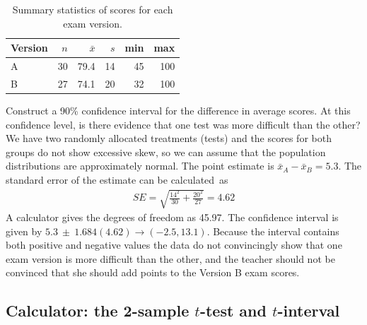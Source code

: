 \begin{table}[hht]
\centering
\begin{tabular}{l rrrrr}
\hline
Version\hspace{2mm}	& $n$	& $\bar{x}$	& $s$	& min	& max  \\
\hline
A		& 30		& 79.4		& 14 	& 45		& 100 \\
B		& 27		& 74.1		& 20		& 32		& 100 \\
\hline
\end{tabular}
\caption{Summary statistics of scores for each exam version.}
\label{summaryStatsForTwoVersionsOfExams2nd}
\end{table}

\begin{example}{Construct a 90\% confidence interval for the difference in average scores. At this confidence level, is there evidence that one test was more difficult than the other?}
We have two randomly allocated treatments (tests) and the scores for both groups do not show excessive skew, so we can assume that the population distributions are approximately normal. The point estimate is $\bar{x}_A - \bar{x}_B = 5.3$. The standard error of the estimate can be calculated~as
\begin{eqnarray*}
SE = \sqrt{\frac{14^2}{30} + \frac{20^2}{27}} = 4.62
\end{eqnarray*}
A calculator gives the degrees of freedom as 45.97.
The confidence interval is given by $5.3\ \pm \ 1.684(4.62)\to (-2.5, 13.1)$. Because the interval contains both positive and negative values the data do not convincingly show that one exam version is more difficult than the other, and the teacher should not be convinced that she should add points to the Version B exam scores.
\end{example}


\subsection{Calculator: the 2-sample $t$-test and $t$-interval}

